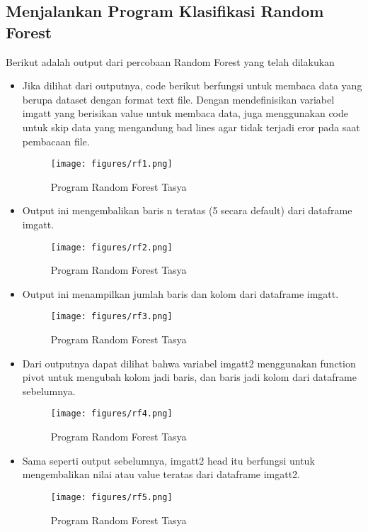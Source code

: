 \subsection{Menjalankan Program Klasifikasi Random Forest}
Berikut adalah output dari percobaan Random Forest yang telah dilakukan
\begin{itemize}
\item Jika dilihat dari outputnya, code berikut berfungsi untuk membaca data yang berupa dataset dengan format text file. Dengan mendefinisikan variabel imgatt yang berisikan value untuk membaca data, juga menggunakan code untuk skip data yang mengandung bad lines agar tidak terjadi eror pada saat pembacaan file.
\begin{figure}[ht]
\centering
\texttt{[image: figures/rf1.png]}\newpage
\caption{Program Random Forest Tasya}
\label{Praktek}
\end{figure}
\item Output ini mengembalikan baris n teratas (5 secara default) dari dataframe imgatt.
\begin{figure}[ht]
\centering
\texttt{[image: figures/rf2.png]}
\caption{Program Random Forest Tasya}
\label{Praktek}
\end{figure}

\item Output ini menampilkan jumlah baris dan kolom dari dataframe imgatt.
\begin{figure}[ht]
\centering
\texttt{[image: figures/rf3.png]}
\caption{Program Random Forest Tasya}
\label{Praktek}
\end{figure}

\item Dari outputnya dapat dilihat bahwa variabel imgatt2 menggunakan function pivot untuk mengubah kolom jadi baris, dan baris jadi kolom dari dataframe sebelumnya.
\begin{figure}[ht]
\centering
\texttt{[image: figures/rf4.png]}
\caption{Program Random Forest Tasya}
\label{Praktek}
\end{figure}

\item Sama seperti output sebelumnya, imgatt2 head itu berfungsi untuk mengembalikan nilai atau value teratas dari dataframe imgatt2.
\begin{figure}[ht]
\centering
\texttt{[image: figures/rf5.png]}
\caption{Program Random Forest Tasya}
\label{Praktek}
\end{figure}


\end{itemize}
